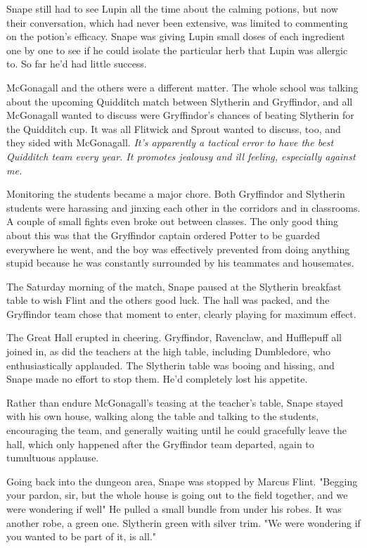 Snape still had to see Lupin all the time about the calming potions, but now their conversation, which had never been extensive, was limited to commenting on the potion's efficacy. Snape was giving Lupin small doses of each ingredient one by one to see if he could isolate the particular herb that Lupin was allergic to. So far he'd had little success.

McGonagall and the others were a different matter. The whole school was talking about the upcoming Quidditch match between Slytherin and Gryffindor, and all McGonagall wanted to discuss were Gryffindor's chances of beating Slytherin for the Quidditch cup. It was all Flitwick and Sprout wanted to discuss, too, and they sided with McGonagall. \emph{It's apparently a tactical error to have the best Quidditch team every year. It promotes jealousy and ill feeling, especially against me.}

Monitoring the students became a major chore. Both Gryffindor and Slytherin students were harassing and jinxing each other in the corridors and in classrooms. A couple of small fights even broke out between classes. The only good thing about this was that the Gryffindor captain ordered Potter to be guarded everywhere he went, and the boy was effectively prevented from doing anything stupid because he was constantly surrounded by his teammates and housemates.

The Saturday morning of the match, Snape paused at the Slytherin breakfast table to wish Flint and the others good luck. The hall was packed, and the Gryffindor team chose that moment to enter, clearly playing for maximum effect.

The Great Hall erupted in cheering. Gryffindor, Ravenclaw, and Hufflepuff all joined in, as did the teachers at the high table, including Dumbledore, who enthusiastically applauded. The Slytherin table was booing and hissing, and Snape made no effort to stop them. He'd completely lost his appetite.

Rather than endure McGonagall's teasing at the teacher's table, Snape stayed with his own house, walking along the table and talking to the students, encouraging the team, and generally waiting until he could gracefully leave the hall, which only happened after the Gryffindor team departed, again to tumultuous applause.

Going back into the dungeon area, Snape was stopped by Marcus Flint. "Begging your pardon, sir, but the whole house is going out to the field together, and we were wondering if{\el} well{\el}" He pulled a small bundle from under his robes. It was another robe, a green one. Slytherin green with silver trim. "We were wondering if you wanted to be part of it, is all."

